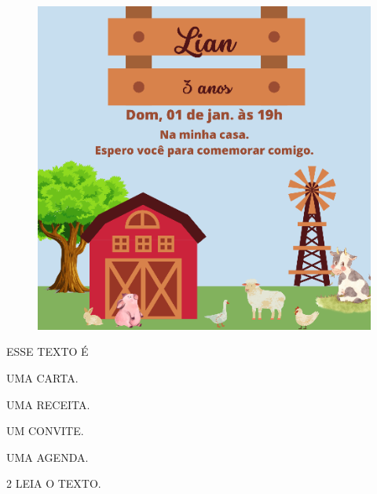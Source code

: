 \vspace{0.5cm}

\begin{figure}[H]
\centering
\includegraphics[width=\textwidth]{media/image157.png}
\end{figure}

ESSE TEXTO É

\begin{escolha}[itemsep=0pt]
\item UMA CARTA.

\item UMA RECEITA.

\item UM CONVITE.

\item UMA AGENDA.
\end{escolha}

\num{2} LEIA O TEXTO.

\vspace{0.5cm}

